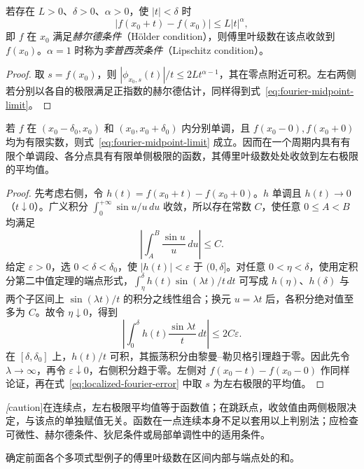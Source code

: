 \documentclass[UTF8,12pt,a4paper,fontset=fandol]{ctexbook}
\begin{document}
\begin{corollary}[李普西茨判别法]
\label{cor:holder-fourier-convergence}
若存在 $L>0$、$\delta>0$、$\alpha>0$，使 $|t|<\delta$ 时
\[
    |f(x_0+t)-f(x_0)|\leq L|t|^\alpha,
\]
即 $f$ 在 $x_0$ 满足\emph{赫尔德条件}（H\"older condition），则傅里叶级数在该点收敛到 $f(x_0)$。$\alpha=1$ 时称为\emph{李普西茨条件}（Lipschitz condition）。
\end{corollary}

\begin{proof}
取 $s=f(x_0)$，则 $|\phi_{x_0,s}(t)|/t\leq2Lt^{\alpha-1}$，其在零点附近可积。左右两侧若分别以各自的极限满足正指数的赫尔德估计，同样得到式~\eqref{eq:fourier-midpoint-limit}。
\end{proof}

\begin{theorem}[狄利克雷判别法]
\label{thm:dirichlet-fourier-convergence}
若 $f$ 在 $(x_0-\delta_0,x_0)$ 和 $(x_0,x_0+\delta_0)$ 内分别单调，且 $f(x_0-0),f(x_0+0)$ 均为有限实数，则式~\eqref{eq:fourier-midpoint-limit} 成立。因而在一个周期内具有有限个单调段、各分点具有有限单侧极限的函数，其傅里叶级数处处收敛到左右极限的平均值。
\end{theorem}

\begin{proof}
先考虑右侧，令 $h(t)=f(x_0+t)-f(x_0+0)$。$h$ 单调且 $h(t)\to0$（$t\downarrow0$）。广义积分 $\int_0^{+\infty}\sin u/u\,du$ 收敛，所以存在常数 $C$，使任意 $0\leq A<B$ 均满足
\[
    \left|\int_A^B\frac{\sin u}{u}\,du\right|\leq C.
\]
给定 $\varepsilon>0$，选 $0<\delta<\delta_0$，使 $|h(t)|<\varepsilon$ 于 $(0,\delta]$。对任意 $0<\eta<\delta$，使用定积分第二中值定理的端点形式，$\int_\eta^\delta h(t)\sin(\lambda t)/t\,dt$ 可写成 $h(\eta)$、$h(\delta)$ 与两个子区间上 $\sin(\lambda t)/t$ 的积分之线性组合；换元 $u=\lambda t$ 后，各积分绝对值至多为 $C$。故令 $\eta\downarrow0$，得到
\[
    \left|\int_0^\delta h(t)\frac{\sin\lambda t}{t}\,dt\right|
        \leq2C\varepsilon.
\]
在 $[\delta,\delta_0]$ 上，$h(t)/t$ 可积，其振荡积分由黎曼--勒贝格引理趋于零。因此先令 $\lambda\to\infty$，再令 $\varepsilon\downarrow0$，右侧积分趋于零。左侧对 $f(x_0-t)-f(x_0-0)$ 作同样论证，再在式~\eqref{eq:localized-fourier-error} 中取 $s$ 为左右极限的平均值。
\end{proof}

\emph[caution]{在连续点，左右极限平均值等于函数值；在跳跃点，收敛值由两侧极限决定，与该点的单独赋值无关。}函数在一点连续本身不足以套用以上判别法；应检查可微性、赫尔德条件、狄尼条件或局部单调性中的适用条件。

\begin{example}
\label{ex:fourier-endpoint-sums}
确定前面各个多项式型例子的傅里叶级数在区间内部与端点处的和。
\end{example}
\end{document}
